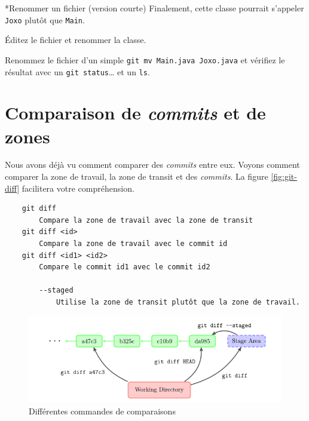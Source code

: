 \documentclass[a4paper,11pt]{style-esi/td}
\begin{document}
\begin{Exercice}*{Renommer un fichier (version courte)}
	Finalement, cette classe pourrait s'appeler \texttt{Joxo} plutôt que 
	\texttt{Main}. 
	\begin{steps}
	
		\item Éditez le fichier et renommer la classe. 
		\item Renommez le fichier d'un simple 
			\texttt{git mv Main.java Joxo.java} et vérifiez le résultat avec un 
			\texttt{git status}… et un \texttt{ls}. 

	\end{steps}
\end{Exercice}



\section{Comparaison de \textit{commits} et de zones}

Nous avons déjà vu comment comparer des \textit{commits} entre eux. Voyons comment
comparer la zone de travail, la zone de transit et des \textit{commits}. La figure \vref{fig:git-diff} facilitera votre compréhension. 

\bigskip
\begin{colxbox}[colback=white,drop fuzzy shadow]
	\begin{verbatim}
	git diff
	    Compare la zone de travail avec la zone de transit
	git diff <id>
	    Compare la zone de travail avec le commit id
	git diff <id1> <id2>
	    Compare le commit id1 avec le commit id2
	
	    --staged
	        Utilise la zone de transit plutôt que la zone de travail.

	\end{verbatim}
\end{colxbox}
\bigskip

\begin{figure}[h]
	\centering
	\includegraphics[width=\linewidth]{img/depot-git-diff.png}
	\caption{Différentes commandes de comparaisons}
	\label{fig:git-diff}
\end{figure}
\end{document}
